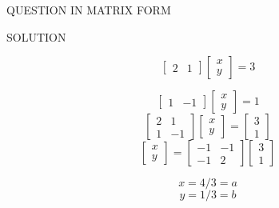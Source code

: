 \documentclass[10pt]{beamer}
\begin{document}
{\begin{frame}{QUESTION IN MATRIX FORM}
 
\end{frame}
\begin{frame}{SOLUTION}

 
    \[
\begin{bmatrix}
2 & 1
\end{bmatrix}
\begin{bmatrix}
x\\
y
\end{bmatrix}
=3

\]

 \[
\begin{bmatrix}
1 & -1
\end{bmatrix}
\begin{bmatrix}
x\\
y
\end{bmatrix}
=1

\]
 \[
\begin{bmatrix}
2 & 1\\
1 & -1
\end{bmatrix}
\begin{bmatrix}
x\\
y
\end{bmatrix}
=
\begin{bmatrix}
3\\
1
\end{bmatrix}

\]
 \[
\begin{bmatrix}
x\\
y
\end{bmatrix}
=
\begin{bmatrix}
-1 & -1\\
-1 & 2

\end{bmatrix}
\begin{bmatrix}
3\\
1
\end{bmatrix}

\]

\begin{equation}
x=4/3=a 
\end{equation}
\begin{equation}
y=1/3=b 
\end{equation}


\end{frame}}
\end{document}
